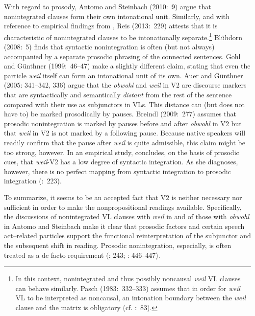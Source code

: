 \begin{styleMoutonText}
With regard to prosody, Antomo and Steinbach (2010:~9) argue that nonintegrated clauses form their own intonational unit. Similarly, and with reference to empirical findings from \citet{Volodina2011}, Reis (2013:~229) attests that it is characteristic of nonintegrated clauses to be intonationally separate.\footnote{In this context, nonintegrated and thus possibly noncausal \textit{weil} VL clauses can behave similarly. Pasch (1983:~332–333) assumes that in order for \textit{weil} VL to be interpreted as noncausal, an intonation boundary between the \textit{weil} clause and the matrix is obligatory (cf. \citealt{Volodina2011}:~83).} Blühdorn (2008:~5) finds that syntactic nonintegration is often (but not always) accompanied by a separate prosodic phrasing of the connected sentences. Gohl and Günthner (1999:~46–47) make a slightly different claim, stating that even the particle \textit{weil} itself can form an intonational unit of its own. Auer and Günthner (2005: 341–342, 336) argue that the \textit{obwohl} and \textit{weil} in V2 are discourse markers that are syntactically and semantically \textit{distant} from the rest of the sentence compared with their use as subjunctors in VLs. This distance can (but does not have to) be marked prosodically by pauses. Breindl (2009:~277) assumes that prosodic nonintegration is marked by pauses before and after \textit{obwohl} in V2 but that \textit{weil} in V2 is not marked by a following pause. Because native speakers will readily confirm that the pause after \textit{weil} is quite admissible, this claim might be too strong, however. In an empirical study, \citet[159]{Volodina2011} concludes, on the basis of prosodic cues, that \textit{weil}{}-V2 has a low degree of syntactic integration. As she diagnoses, however, there is no perfect mapping from syntactic integration to prosodic integration (\citealt{Volodina2011}:~223).
\end{styleMoutonText}

\begin{styleMoutonText}
To summarize, it seems to be an accepted fact that V2 is neither necessary nor sufficient in order to make the nonpropositional readings available. Specifically, the discussions of nonintegrated VL clauses with \textit{weil} in \citet{Reis2013} and of those with \textit{obwohl} in Antomo and Stein\-bach  make it clear that prosodic factors and certain speech act–related particles support the functional reinterpretation of the subjunctor and the subse\-quent shift in reading. Prosodic nonintegration, especially, is often treated as a de facto requirement (\citealt{Reis2013}: 243; \citealt{AntomoSteinbach2013}: 446–447).
\end{styleMoutonText}

